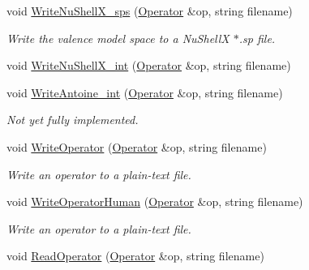 \begin{DoxyCompactItemize}
\item 
\hypertarget{classReadWrite_a8a7dc85b22c8f468d153d3fde9f39394}{void \hyperlink{classReadWrite_a8a7dc85b22c8f468d153d3fde9f39394}{Write\-Nu\-Shell\-X\-\_\-sps} (\hyperlink{classOperator}{Operator} \&op, string filename)}\label{classReadWrite_a8a7dc85b22c8f468d153d3fde9f39394}

\begin{DoxyCompactList}\small\item\em Write the valence model space to a Nu\-Shell\-X $\ast$.sp file. \end{DoxyCompactList}\item 
void \hyperlink{classReadWrite_a2028159ab7f8c227613834b39794e157}{Write\-Nu\-Shell\-X\-\_\-int} (\hyperlink{classOperator}{Operator} \&op, string filename)
\item 
\hypertarget{classReadWrite_a371194595d9412cbb8f1b432a6526f5a}{void \hyperlink{classReadWrite_a371194595d9412cbb8f1b432a6526f5a}{Write\-Antoine\-\_\-int} (\hyperlink{classOperator}{Operator} \&op, string filename)}\label{classReadWrite_a371194595d9412cbb8f1b432a6526f5a}

\begin{DoxyCompactList}\small\item\em Not yet fully implemented. \end{DoxyCompactList}\item 
\hypertarget{classReadWrite_a771ed1ac7ca0cc9cb6a209da170dd351}{void \hyperlink{classReadWrite_a771ed1ac7ca0cc9cb6a209da170dd351}{Write\-Operator} (\hyperlink{classOperator}{Operator} \&op, string filename)}\label{classReadWrite_a771ed1ac7ca0cc9cb6a209da170dd351}

\begin{DoxyCompactList}\small\item\em Write an operator to a plain-\/text file. \end{DoxyCompactList}\item 
\hypertarget{classReadWrite_af9e6ed6e522518f28ebb5d869f571485}{void \hyperlink{classReadWrite_af9e6ed6e522518f28ebb5d869f571485}{Write\-Operator\-Human} (\hyperlink{classOperator}{Operator} \&op, string filename)}\label{classReadWrite_af9e6ed6e522518f28ebb5d869f571485}

\begin{DoxyCompactList}\small\item\em Write an operator to a plain-\/text file. \end{DoxyCompactList}\item 
\hypertarget{classReadWrite_ab924c67864c7af28bcc22a9b87abafb3}{void \hyperlink{classReadWrite_ab924c67864c7af28bcc22a9b87abafb3}{Read\-Operator} (\hyperlink{classOperator}{Operator} \&op, string filename)}\label{classReadWrite_ab924c67864c7af28bcc22a9b87abafb3}


\end{DoxyCompactItemize}
